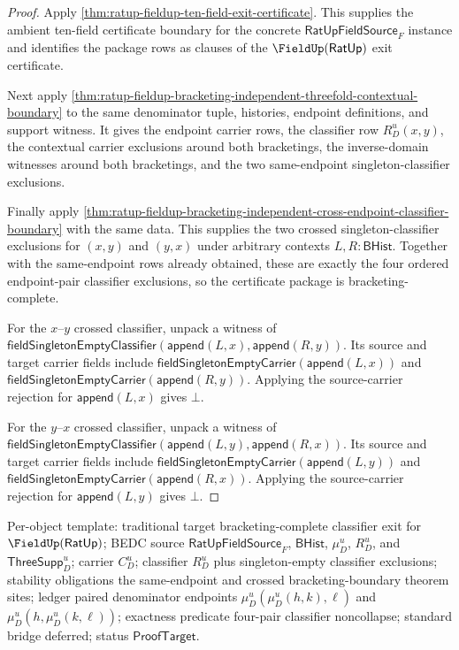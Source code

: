 \begin{proof}
Apply \autoref{thm:ratup-fieldup-ten-field-exit-certificate}. This supplies
the ambient ten-field certificate boundary for the concrete
$\mathsf{RatUpFieldSource}_F$ instance and identifies the package rows as
clauses of the $\FieldUp(\mathsf{RatUp})$ exit certificate.

Next apply
\autoref{thm:ratup-fieldup-bracketing-independent-threefold-contextual-boundary}
to the same denominator tuple, histories, endpoint definitions, and support
witness. It gives the endpoint carrier rows, the classifier row
$R_D^u(x,y)$, the contextual carrier exclusions around both bracketings, the
inverse-domain witnesses around both bracketings, and the two same-endpoint
singleton-classifier exclusions.

Finally apply
\autoref{thm:ratup-fieldup-bracketing-independent-cross-endpoint-classifier-boundary}
with the same data. This supplies the two crossed singleton-classifier
exclusions for $(x,y)$ and $(y,x)$ under arbitrary contexts $L,R:\mathsf{BHist}$.
Together with the same-endpoint rows already obtained, these are exactly the
four ordered endpoint-pair classifier exclusions, so the certificate package is
bracketing-complete.

For the $x$--$y$ crossed classifier, unpack a witness of
$\mathsf{fieldSingletonEmptyClassifier}(\mathsf{append}(L,x),\mathsf{append}(R,y))$.
Its source and target carrier fields include
$\mathsf{fieldSingletonEmptyCarrier}(\mathsf{append}(L,x))$ and
$\mathsf{fieldSingletonEmptyCarrier}(\mathsf{append}(R,y))$. Applying the
source-carrier rejection for $\mathsf{append}(L,x)$ gives $\bot$.

For the $y$--$x$ crossed classifier, unpack a witness of
$\mathsf{fieldSingletonEmptyClassifier}(\mathsf{append}(L,y),\mathsf{append}(R,x))$.
Its source and target carrier fields include
$\mathsf{fieldSingletonEmptyCarrier}(\mathsf{append}(L,y))$ and
$\mathsf{fieldSingletonEmptyCarrier}(\mathsf{append}(R,x))$. Applying the
source-carrier rejection for $\mathsf{append}(L,y)$ gives $\bot$.
\end{proof}

Per-object template: traditional target bracketing-complete classifier exit for
$\FieldUp(\mathsf{RatUp})$; BEDC source $\mathsf{RatUpFieldSource}_F$,
$\mathsf{BHist}$, $\mu_D^u$, $R_D^u$, and $\mathsf{ThreeSupp}_D^u$; carrier
$C_D^u$; classifier $R_D^u$ plus singleton-empty classifier exclusions;
stability obligations the same-endpoint and crossed bracketing-boundary theorem
sites; ledger paired denominator endpoints $\mu_D^u(\mu_D^u(h,k),\ell)$ and
$\mu_D^u(h,\mu_D^u(k,\ell))$; exactness predicate four-pair classifier
noncollapse; standard bridge deferred; status $\mathsf{ProofTarget}$.


